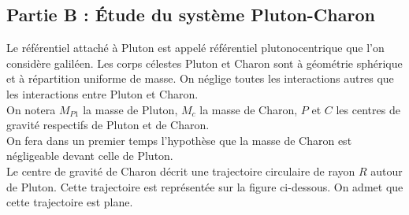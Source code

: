 \documentclass[a4paper,12pt]{article}
\begin{document}
\subsection*{Partie B : Étude du système Pluton-Charon}
Le référentiel attaché à Pluton est appelé référentiel plutonocentrique que l'on considère galiléen. Les corps célestes Pluton et Charon sont à géométrie sphérique et à répartition uniforme de masse. On néglige toutes les interactions autres que les interactions entre Pluton et Charon.\\
On notera $M_{P1}$ la masse de Pluton, $M_c$ la masse de Charon, $P$ et $C$ les centres de gravité respectifs de Pluton et de Charon.\\
On fera dans un premier temps l'hypothèse que la masse de Charon est négligeable devant celle de Pluton.\\
Le centre de gravité de Charon décrit une trajectoire circulaire de rayon $R$ autour de Pluton. Cette trajectoire est représentée sur la figure ci-dessous. On admet que cette trajectoire est plane.
\begin{center}
\end{center}
\end{document}
